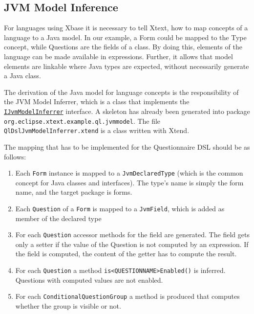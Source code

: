 \subsection{JVM Model Inference}

For languages using Xbase it is necessary to tell Xtext, how to map concepts of a language to a Java model. In our example,
a Form could be mapped to the Type concept, while Questions are the fields of a class. By doing this, elements of the language
can be made available in expressions. Further, it allows that model elements are linkable where Java types are expected, without
necessarily generate a Java class.

The derivation of the Java model for language concepts is the responsibility of the JVM Model Inferrer, which is a class that implements
the \href{http://download.eclipse.org/modeling/tmf/xtext/javadoc/2.3/org/eclipse/xtext/xbase/jvmmodel/IJvmModelInferrer.html}{\texttt{IJvmModelInferrer}} interface.
A skeleton has already been generated into package \texttt{org.eclipse.xtext.example.ql.jvmmodel}. The file \texttt{QlDslJvmModelInferrer.xtend} is a class
written with Xtend.

The mapping that has to be implemented for the Questionnaire DSL should be as follows:
\begin{enumerate}
  \item Each \texttt{Form} instance is mapped to a \texttt{JvmDeclaredType} (which is the common concept for Java classes and interfaces).
  The type's name is simply the form name, and the target package is forms.
  \item Each \texttt{Question} of a \texttt{Form} is mapped to a \texttt{JvmField}, which is added as member of the declared type
  \item For each \texttt{Question} accessor methods for the field are generated. The field gets only a setter if the value of the Question is
  not computed by an expression. If the field is computed, the content of the getter has to compute the result.
  \item For each \texttt{Question} a method \texttt{is<QUESTIONNAME>Enabled()} is inferred.
  Questions with computed values are not enabled.
  \item For each \texttt{ConditionalQuestionGroup} a method is produced that computes
  whether the group is visible or not. 
\end{enumerate}

